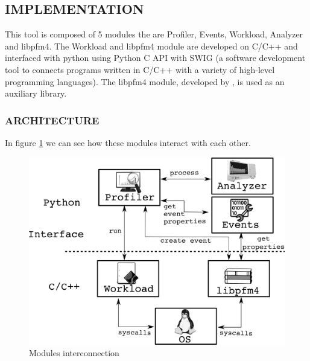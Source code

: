 \subsection{IMPLEMENTATION}


This tool is composed of 5 modules the are Profiler, Events, Workload, Analyzer and libpfm4. 
The Workload and libpfm4 module are developed on C/C++ and interfaced with python using Python C API with SWIG (a software development tool to connects programs written in C/C++ with a variety of high-level programming languages). 
The libpfm4 module, developed by \cite{Eranian2008}, is used as an auxiliary library.


\subsubsection{ARCHITECTURE}

In figure \ref{fig:achitecture} we can see how these modules interact with each other.
\begin{figure}[H]
    \centering
    \includegraphics[width=\textwidth]{fingerprint/figures/architecture.png}
    \caption{Modules interconnection}
    \label{fig:achitecture}
\end{figure}

